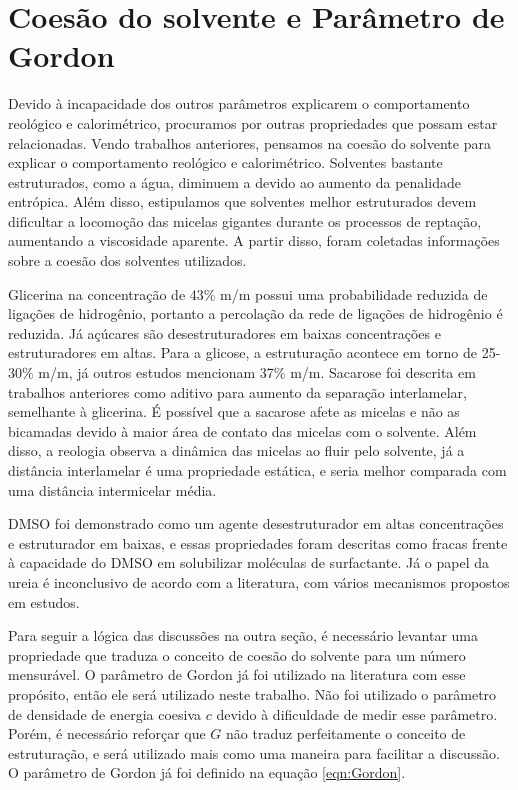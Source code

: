 		
		\FloatBarrier
		\section{Coesão do solvente e Parâmetro de Gordon}  %
		
		Devido à incapacidade dos outros parâmetros explicarem o comportamento reológico e calorimétrico, procuramos por outras propriedades que possam estar relacionadas. Vendo trabalhos anteriores, pensamos na coesão do solvente para explicar o comportamento reológico e calorimétrico. Solventes bastante estruturados, como a água, diminuem a \cmc{} devido ao aumento da penalidade entrópica. Além disso, estipulamos que solventes melhor estruturados devem dificultar a locomoção das micelas gigantes durante os processos de reptação, aumentando a viscosidade aparente. A partir disso, foram coletadas informações sobre a coesão dos solventes utilizados.
		
		Glicerina na concentração de 43\% m/m possui uma probabilidade reduzida de ligações de hidrogênio, portanto a percolação da rede de ligações de hidrogênio é reduzida. Já açúcares são desestruturadores em baixas concentrações e estruturadores em altas. Para a glicose, a estruturação acontece em torno de 25-30\% m/m, já outros estudos mencionam 37\% m/m. Sacarose foi descrita em trabalhos anteriores como aditivo para aumento da separação interlamelar, semelhante à glicerina. É possível que a sacarose afete as micelas e não as bicamadas devido à maior área de contato das micelas com o solvente. Além disso, a reologia observa a dinâmica das micelas ao fluir pelo solvente, já a distância interlamelar é uma propriedade estática, e seria melhor comparada com uma distância intermicelar média.
		
		DMSO foi demonstrado como um agente desestruturador em altas concentrações e estruturador em baixas, e essas propriedades foram descritas como fracas frente à capacidade do DMSO em solubilizar moléculas de surfactante. %
		Já o papel da ureia é inconclusivo de acordo com a literatura, com vários mecanismos propostos em estudos. %
		
		Para seguir a lógica das discussões na outra seção, é necessário levantar uma propriedade que traduza o conceito de coesão do solvente para um número mensurável. O parâmetro de Gordon já foi utilizado na literatura com esse propósito, então ele será utilizado neste trabalho. Não foi utilizado o parâmetro de densidade de energia coesiva \(c\) devido à dificuldade de medir esse parâmetro. Porém, é necessário reforçar que \(G\) não traduz perfeitamente o conceito de estruturação, e será utilizado mais como uma maneira para facilitar a discussão. O parâmetro de Gordon já foi definido na equação \ref{eqn:Gordon}.
		
